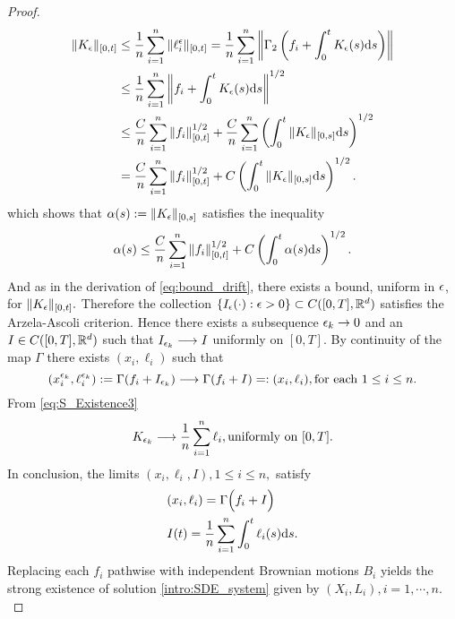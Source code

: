 \begin{proof}
	\begin{align}
		\begin{split}\label{eq:Arzela_Ascoli_approx}
			\|K_\epsilon\|_{[0, t]} &\leq \frac{1}{n}\sum_{i=1}^n\|\ell_i^{\epsilon}\|_{[0, t]}
			= \frac{1}{n}\sum_{i=1}^n\left\| \Gamma_2\left(f_i + \int_0^tK_\epsilon(s)\mathrm{d} s\right)\right\|\\
			&\leq \frac{1}{n}\sum_{i=1}^n\left\|f_i+ \int_0^tK_\epsilon(s) \mathrm{d} s\right\|^{1/2}\\
			&\leq \frac{C}{n}\sum_{i=1}^n\|f_i\|_{[0, t]}^{1/2} + \frac{C}{n}\sum_{i = 1}^n\left(\int_0^t\|K_\epsilon\|_{[0, s]}\mathrm{d} s\right)^{1/2}\\
			&= \frac{C}{n}\sum_{i=1}^n\|f_i\|_{[0, t]}^{1/2} + C\left(\int_0^t\|K_\epsilon\|_{[0, s]}\mathrm{d} s\right)^{1/2}.
		\end{split}
	\end{align} 
	which shows that $\alpha(s) := \|K_\epsilon\|_{[0, s]}$ satisfies the inequality 
	\[
	\alpha(s) \leq \frac{C}{n}\sum_{i=1}^n\|f_i\|_{[0, t]}^{1/2} + C\left( \int_0^t\alpha(s)\mathrm{d} s\right)^{1/2}.
	\] And as in the derivation of \eqref{eq:bound_drift}, there exists a bound, uniform in $\epsilon$, for $\|K_\epsilon\|_{[0, t]}.$ Therefore the collection $\{I_\epsilon(\cdot) : \epsilon > 0\} \subset C([0, T], \mathbb{R}^d)$ satisfies the Arzela-Ascoli 
	criterion. Hence there exists a subsequence $\epsilon_k \to 0$ and an $I \in C([0, T], \mathbb{R}^d)$ such that
	$I_{\epsilon_k} \longrightarrow I$ uniformly on $[0, T]$. By continuity of the map $\Gamma$ there exists $(x_i, \ell_i)$ such that
	\[
	(x_i^{\epsilon_k}, \ell_i^{\epsilon_k}) := \Gamma(f_i + I_{\epsilon_k}) \longrightarrow \Gamma(f_i + I) =: (x_i, \ell_i), \text{for each $1 \leq i \leq n$}.
	\]
	From \eqref{eq:S_Existence3} 
	\[
	K_{\epsilon_k} \longrightarrow \frac{1}{n}\sum_{i = 1}^n \ell_i, \text{uniformly on $[0, T]$}.
	\]
	In conclusion, the limits $(x_i, \ell_i, I), 1 \leq i \leq n,$ satisfy
	\begin{align}
		&(x_i, \ell_i) = \Gamma\Big(f_i + I\Big)\\
		&I(t) = \frac{1}{n}\sum_{i = 1}^n\int_0^t\ell_i(s)\mathrm{d} s.
	\end{align}
	Replacing each $f_i$ pathwise with independent Brownian motions $B_i$ yields the strong existence of solution \eqref{intro:SDE_system} given by $(X_i, L_i), i = 1, \cdots, n.$
\end{proof}

